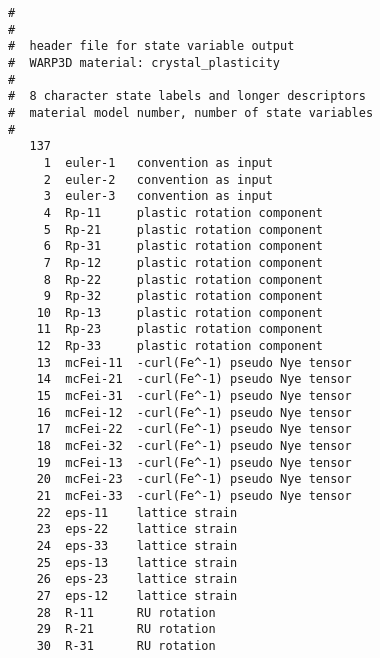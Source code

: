 \documentclass[11pt]{report}
\numberwithin{equation}{section}
\begin{document}
\small
\begin{verbatim}
#
#
#  header file for state variable output
#  WARP3D material: crystal_plasticity  
#
#  8 character state labels and longer descriptors
#  material model number, number of state variables 
#
   137
     1  euler-1   convention as input                                         
     2  euler-2   convention as input                                         
     3  euler-3   convention as input                                         
     4  Rp-11     plastic rotation component                                  
     5  Rp-21     plastic rotation component                                  
     6  Rp-31     plastic rotation component                                  
     7  Rp-12     plastic rotation component                                  
     8  Rp-22     plastic rotation component                                  
     9  Rp-32     plastic rotation component                                  
    10  Rp-13     plastic rotation component                                  
    11  Rp-23     plastic rotation component                                  
    12  Rp-33     plastic rotation component                                  
    13  mcFei-11  -curl(Fe^-1) pseudo Nye tensor                              
    14  mcFei-21  -curl(Fe^-1) pseudo Nye tensor                              
    15  mcFei-31  -curl(Fe^-1) pseudo Nye tensor                              
    16  mcFei-12  -curl(Fe^-1) pseudo Nye tensor                              
    17  mcFei-22  -curl(Fe^-1) pseudo Nye tensor                              
    18  mcFei-32  -curl(Fe^-1) pseudo Nye tensor                              
    19  mcFei-13  -curl(Fe^-1) pseudo Nye tensor                              
    20  mcFei-23  -curl(Fe^-1) pseudo Nye tensor                              
    21  mcFei-33  -curl(Fe^-1) pseudo Nye tensor                              
    22  eps-11    lattice strain                                              
    23  eps-22    lattice strain                                              
    24  eps-33    lattice strain                                              
    25  eps-13    lattice strain                                              
    26  eps-23    lattice strain                                              
    27  eps-12    lattice strain                                              
    28  R-11      RU rotation                                                 
    29  R-21      RU rotation                                                 
    30  R-31      RU rotation                                                 

\end{verbatim}
\end{document}
